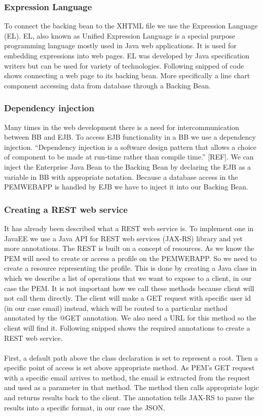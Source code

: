 \documentclass[12pt, a4paper]{report}   %
\begin{document}
\begin{enumerate}
\subsubsection{Expression Language}
To connect the backing bean to the XHTML file we use the Expression Language (EL). EL, also known as Unified Expression Language is a special purpose programming language mostly used in Java web applications. It is used for embedding expressions into web pages. EL was developed by Java specification writers but can be used for variety of technologies. Following snipped of code shows connecting a web page to its backing bean. More specifically a line chart component accessing data from database through a Backing Bean.


\subsubsection{Dependency injection}
Many times in the web development there is a need for intercommunication between BB and EJB. To access EJB functionality in a BB we use a dependency injection. “Dependency injection is a software design pattern that allows a choice of component to be made at run-time rather than compile time.” [REF]. We can inject the Enterprise Java Bean to the Backing Bean by declaring the EJB as a variable in BB with appropriate notation. Because a database access in the PEMWEBAPP is handled by EJB we have to inject it into our Backing Bean.


\subsubsection{Creating a REST web service}
It has already been described what a REST web service is. To implement one in JavaEE we use a Java API for REST web services (JAX-RS) library and yet more annotations. The REST is built on a concept of resources. As we know the PEM will need to create or access a profile on the PEMWEBAPP. So we need to create a resource representing the profile. This is done by creating a Java class in which we describe a list of operations that we want to expose to a client, in our case the PEM. It is not important how we call these methods because client will not call them directly. The client will make a GET request with specific user id (in our case email) instead, which will be routed to a particular method annotated by the @GET annotation. We also need a URL for this method so the client will find it. Following snipped shows the required annotations to create a REST web service.\\ \\
First, a default path above the class declaration is set to represent a root. Then a specific point of access is set above appropriate method. As PEM's GET request with a specific email arrives to  method, the email is extracted from the request and used as a parameter in that method. The method then calls appropriate logic and returns results back to the client. The annotation \@Produces tells JAX-RS to parse the results into a specific format, in our case the JSON.


\end{enumerate}
\end{document}
